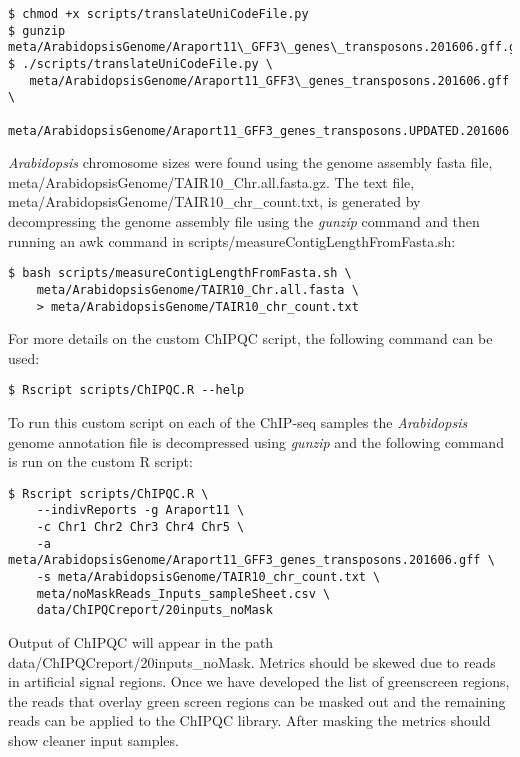 \documentclass{article}
\begin{document}
\begin{sloppypar}
\begin{verbatim}
$ chmod +x scripts/translateUniCodeFile.py
$ gunzip meta/ArabidopsisGenome/Araport11\_GFF3\_genes\_transposons.201606.gff.gz
$ ./scripts/translateUniCodeFile.py \
   meta/ArabidopsisGenome/Araport11_GFF3\_genes_transposons.201606.gff \
   meta/ArabidopsisGenome/Araport11_GFF3_genes_transposons.UPDATED.201606.gff   
\end{verbatim}

\emph{Arabidopsis} chromosome sizes were found using the genome assembly fasta file,  {\selectfont meta/ArabidopsisGenome/TAIR10\_Chr.all.fasta.gz}. The text file, {\selectfont meta/ArabidopsisGenome/TAIR10\_chr\_count.txt}, is generated by decompressing the genome assembly file using the \emph{gunzip} command and then running an awk command in {\selectfont scripts/measureContigLengthFromFasta.sh}:

\begin{verbatim}
$ bash scripts/measureContigLengthFromFasta.sh \
    meta/ArabidopsisGenome/TAIR10_Chr.all.fasta \
    > meta/ArabidopsisGenome/TAIR10_chr_count.txt
\end{verbatim}

For more details on the custom ChIPQC script, the following command can be used:
\begin{verbatim}
$ Rscript scripts/ChIPQC.R --help
\end{verbatim}

To run this custom script on each of the ChIP-seq samples the \emph{Arabidopsis} genome annotation file is decompressed using \emph{gunzip} and the following command is run on the custom R script:

\begin{verbatim}
$ Rscript scripts/ChIPQC.R \
    --indivReports -g Araport11 \
    -c Chr1 Chr2 Chr3 Chr4 Chr5 \
    -a meta/ArabidopsisGenome/Araport11_GFF3_genes_transposons.201606.gff \
    -s meta/ArabidopsisGenome/TAIR10_chr_count.txt \
    meta/noMaskReads_Inputs_sampleSheet.csv \
    data/ChIPQCreport/20inputs_noMask
\end{verbatim}

Output of ChIPQC will appear in the path {\selectfont data/ChIPQCreport/20inputs\_noMask}. Metrics should be skewed due to reads in artificial signal regions. Once we have developed the list of greenscreen regions, the reads that overlay green screen regions can be masked out and the remaining reads can be applied to the ChIPQC library. After masking the metrics should show cleaner input samples. 


\end{sloppypar}
\end{document}
